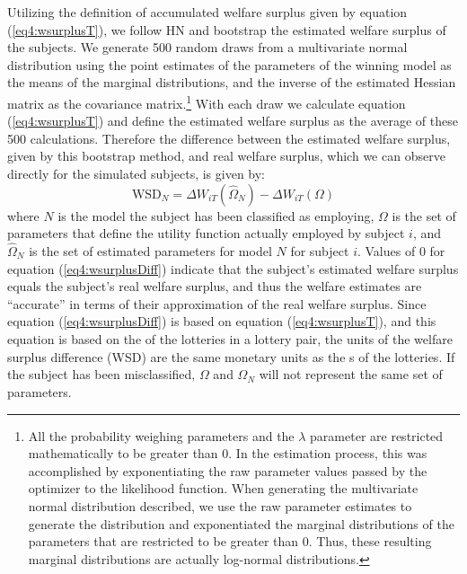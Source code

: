 \documentclass[../main.tex]{subfiles}
\begin{document}
Utilizing the definition of accumulated welfare surplus given by equation (\ref{eq4:wsurplusT}), we follow HN \parencite*[110-111]{Harrison2016} and bootstrap the estimated welfare surplus of the subjects.
We generate 500 random draws from a multivariate normal distribution using the point estimates of the parameters of the winning model as the means of the marginal distributions, and the inverse of the estimated Hessian matrix as the covariance matrix.\footnote{
	All the probability weighing parameters and the $\lambda$ parameter are restricted mathematically to be greater than 0.
	In the estimation process, this was accomplished by exponentiating the raw parameter values passed by the optimizer to the likelihood function.
	When generating the multivariate normal distribution described, we use the raw parameter estimates to generate the distribution and exponentiated the marginal distributions of the parameters that are restricted to be greater than 0.
	Thus, these resulting marginal distributions are actually log-normal distributions.
}
With each draw we calculate equation (\ref{eq4:wsurplusT}) and define the estimated welfare surplus as the average of these 500 calculations.
Therefore the difference between the estimated welfare surplus, given by this bootstrap method, and real welfare surplus, which we can observe directly for the simulated subjects, is given by:
\begin{equation}
	\label{eq4:wsurplusDiff}
	\text{WSD}_N = \Delta W_{iT}(\hat{\Omega}_N) - \Delta W_{iT}(\Omega)
\end{equation}
\noindent where $N$ is the model the subject has been classified as employing, $\Omega$ is the set of parameters that define the utility function actually employed by subject $i$, and $\hat{\Omega}_N$ is the set of estimated parameters for model $N$ for subject $i$.
Values of 0 for equation (\ref{eq4:wsurplusDiff}) indicate that the subject's estimated welfare surplus equals the subject's real welfare surplus, and thus the welfare estimates are \enquote{accurate} in terms of their approximation of the real welfare surplus.
Since equation (\ref{eq4:wsurplusDiff}) is based on equation (\ref{eq4:wsurplusT}), and this equation is based on the {\CE} of the lotteries in a lottery pair, the units of the welfare surplus difference (WSD) are the same monetary units as the {\CE}s of the lotteries.
If the subject has been misclassified, $\Omega$ and $\hat{\Omega}_N$ will not represent the same set of parameters.
\end{document}
